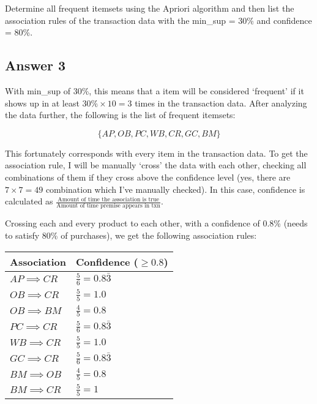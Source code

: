 \documentclass[
  11pt, %
]{assignment}
\begin{document}
\pagebreak

\begin{problem}
Determine all frequent itemsets using the Apriori algorithm and then list the association rules of the transaction data with the min\_sup = 30\% and confidence = 80\%.
\end{problem}

\subsection*{Answer 3}

With min\_sup of 30\%, this means that a item will be considered `frequent' if it shows up in at least \(30\% \times 10 = 3\) times in the transaction data. After analyzing the data further, the following is the list of frequent itemsets:

\[ \{AP, OB, PC, WB, CR, GC, BM\} \]

This fortunately corresponds with every item in the transaction data. To get the association rule, I will be manually `cross' the data with each other, checking all combinations of them if they cross above the confidence level (yes, there are \(7 \times 7 = 49\) combination which I've manually checked). In this case, confidence is calculated as \(\frac{\text{Amount of time the association is true}}{\text{Amount of time premise appears in txn}}\).

Crossing each and every product to each other, with a confidence of 0.8\% (needs to satisfy 80\% of purchases), we get the following association rules:

\begin{center}
	\begin{tabular}{l | l}
		Association        & Confidence (\(\ge0.8\))        \\
		\toprule
		\(AP \implies CR\) & \( \frac{5}{6} = 0.8\bar{3} \) \\
		\midrule
		\(OB \implies CR\) & \( \frac{5}{5} = 1.0 \)        \\
		\(OB \implies BM\) & \( \frac{4}{5} = 0.8 \)        \\
		\midrule
		\(PC \implies CR\) & \( \frac{5}{6} = 0.8\bar{3} \) \\
		\midrule
		\(WB \implies CR\) & \( \frac{5}{5} = 1.0 \)        \\
		\midrule
		\midrule
		\(GC \implies CR\) & \( \frac{5}{6} = 0.8\bar{3} \) \\
		\midrule
		\(BM \implies OB\) & \( \frac{4}{5} = 0.8 \)        \\
		\(BM \implies CR\) & \( \frac{5}{5} = 1 \)          \\
	\end{tabular}
\end{center}

\end{document}
